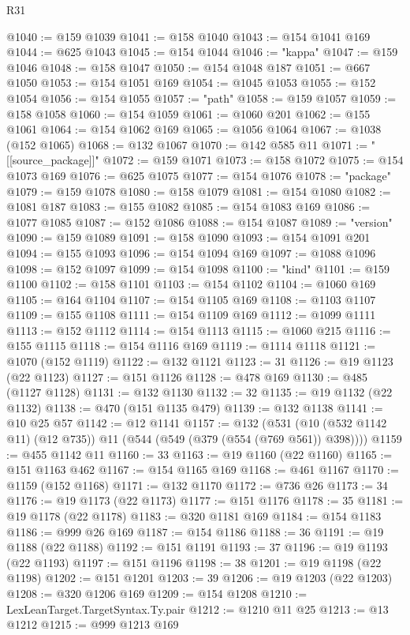 \begin{lexlean}{R31}
\begin{coremodule}
@1040 := @159 @1039
@1041 := @158 @1040
@1043 := @154 @1041 @169
@1044 := @625 @1043
@1045 := @154 @1044
@1046 := "kappa"
@1047 := @159 @1046
@1048 := @158 @1047
@1050 := @154 @1048 @187
@1051 := @667 @1050
@1053 := @154 @1051 @169
@1054 := @1045 @1053
@1055 := @152 @1054
@1056 := @154 @1055
@1057 := "path"
@1058 := @159 @1057
@1059 := @158 @1058
@1060 := @154 @1059
@1061 := @1060 @201
@1062 := @155 @1061
@1064 := @154 @1062 @169
@1065 := @1056 @1064
@1067 := @1038 (@152 @1065)
@1068 := @132 @1067
@1070 := @142 @585 @11
@1071 := "[[source_package]]"
@1072 := @159 @1071
@1073 := @158 @1072
@1075 := @154 @1073 @169
@1076 := @625 @1075
@1077 := @154 @1076
@1078 := "package"
@1079 := @159 @1078
@1080 := @158 @1079
@1081 := @154 @1080
@1082 := @1081 @187
@1083 := @155 @1082
@1085 := @154 @1083 @169
@1086 := @1077 @1085
@1087 := @152 @1086
@1088 := @154 @1087
@1089 := "version"
@1090 := @159 @1089
@1091 := @158 @1090
@1093 := @154 @1091 @201
@1094 := @155 @1093
@1096 := @154 @1094 @169
@1097 := @1088 @1096
@1098 := @152 @1097
@1099 := @154 @1098
@1100 := "kind"
@1101 := @159 @1100
@1102 := @158 @1101
@1103 := @154 @1102
@1104 := @1060 @169
@1105 := @164 @1104
@1107 := @154 @1105 @169
@1108 := @1103 @1107
@1109 := @155 @1108
@1111 := @154 @1109 @169
@1112 := @1099 @1111
@1113 := @152 @1112
@1114 := @154 @1113
@1115 := @1060 @215
@1116 := @155 @1115
@1118 := @154 @1116 @169
@1119 := @1114 @1118
@1121 := @1070 (@152 @1119)
@1122 := @132 @1121
@1123 := 31
@1126 := @19 @1123 (@22 @1123)
@1127 := @151 @1126
@1128 := @478 @169
@1130 := @485 (@1127 @1128)
@1131 := @132 @1130
@1132 := 32
@1135 := @19 @1132 (@22 @1132)
@1138 := @470 (@151 @1135 @479)
@1139 := @132 @1138
@1141 := @10 @25 @57
@1142 := @12 @1141
@1157 := @132
    (@531 (@10 (@532 @1142 @11) (@12 @735)) @11 (@544 (@549 (@379 (@554 (@769 @561)) @398))))
@1159 := @455 @1142 @11
@1160 := 33
@1163 := @19 @1160 (@22 @1160)
@1165 := @151 @1163 @462
@1167 := @154 @1165 @169
@1168 := @461 @1167
@1170 := @1159 (@152 @1168)
@1171 := @132 @1170
@1172 := @736 @26
@1173 := 34
@1176 := @19 @1173 (@22 @1173)
@1177 := @151 @1176
@1178 := 35
@1181 := @19 @1178 (@22 @1178)
@1183 := @320 @1181 @169
@1184 := @154 @1183
@1186 := @999 @26 @169
@1187 := @154 @1186
@1188 := 36
@1191 := @19 @1188 (@22 @1188)
@1192 := @151 @1191
@1193 := 37
@1196 := @19 @1193 (@22 @1193)
@1197 := @151 @1196
@1198 := 38
@1201 := @19 @1198 (@22 @1198)
@1202 := @151 @1201
@1203 := 39
@1206 := @19 @1203 (@22 @1203)
@1208 := @320 @1206 @169
@1209 := @154 @1208
@1210 := LexLeanTarget.TargetSyntax.Ty.pair
@1212 := @1210 @11 @25
@1213 := @13 @1212
@1215 := @999 @1213 @169

\end{coremodule}
\end{lexlean}
